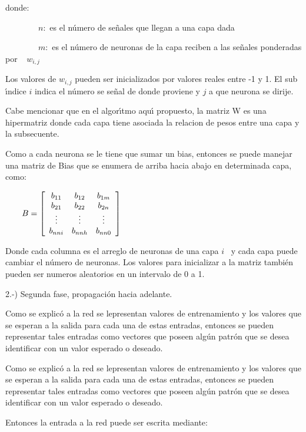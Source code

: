 donde:

\bigskip$\qquad\qquad n:$ es el n\'{u}mero de se\~{n}ales que llegan a una
capa dada

$\qquad\qquad m:$ es el n\'{u}mero de neuronas de la capa reciben a las
se\~{n}ales ponderadas por$\ \ \ \ \ w_{i,j}$

Los valores de $w_{i,j}$ pueden ser inicializados por valores reales entre -1
y 1. El sub \'{\i}ndice $i$ indica el n\'{u}mero se se\~{n}al de donde
proviene y $j$ a que neurona se dirije.

Cabe mencionar que en el algor\'{\i}tmo aqu\'{\i} propuesto, la matriz W es
una hipermatriz donde cada capa tiene asociada la relacion de pesos entre una
capa y la subsecuente.

Como a cada neurona se le tiene que sumar un bias, entonces se puede manejar
una matriz de Bias que se enumera de arriba hacia abajo en determinada capa, como:

\begin{center}
$\qquad B=\left[
\begin{array}
[c]{ccc}%
b_{11} & b_{12} & b_{1m}\\
b_{21} & b_{22} & b_{2n}\\
\vdots & \vdots & \vdots\\
b_{nni} & b_{nnh} & b_{nn0}%
\end{array}
\right]  $
\end{center}

Donde cada columna es el arreglo de neuronas de una capa $i$ \ y cada capa
puede cambiar el n\'{u}mero de neuronas. Los valores para inicializar a la
matriz tambi\'{e}n pueden ser numeros aleatorios en un intervalo de 0 a 1.

2.-) Segunda fase, propagaci\'{o}n hacia adelante.

Como se explic\'{o} a la red se lepresentan valores de entrenamiento y los
valores que se esperan a la salida para cada una de estas entradas, entonces
se pueden representar tales entradas como vectores que poseen alg\'{u}n
patr\'{o}n que se desea identificar con un valor esperado o deseado.

Como se explic\'{o} a la red se lepresentan valores de entrenamiento y los
valores que se esperan a la salida para cada una de estas entradas, entonces
se pueden representar tales entradas como vectores que poseen alg\'{u}n
patr\'{o}n que se desea identificar con un valor esperado o deseado.

Entonces la entrada a la red puede ser escrita mediante:

